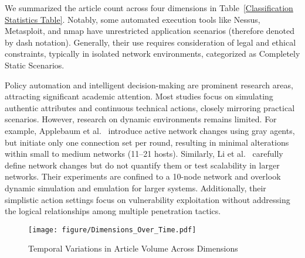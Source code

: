 
We summarized the article count across four dimensions in Table~\ref{Classification Statistics Table}. Notably, some automated execution tools like Nessus, Metasploit, and nmap have unrestricted application scenarios (therefore denoted by dash notation). Generally, their use requires consideration of legal and ethical constraints, typically in isolated network environments, categorized as Completely Static Scenarios.



Policy automation and intelligent decision-making are prominent research areas, attracting significant academic attention. Most studies focus on simulating authentic attributes and continuous technical actions, closely mirroring practical scenarios. However, research on dynamic environments remains limited. For example, Applebaum et al.~\cite{applebaum2017analysis} introduce active network changes using gray agents, but initiate only one connection set per round, resulting in minimal alterations within small to medium networks (11–21 hosts). Similarly, Li et al.~\cite{li2024dynpen} carefully define network changes but do not quantify them or test scalability in larger networks. Their experiments are confined to a 10-node network and overlook dynamic simulation and emulation for larger systems. Additionally, their simplistic action settings focus on vulnerability exploitation without addressing the logical relationships among multiple penetration tactics.

\begin{figure*}[tb]
    \centering
    \texttt{[image: figure/Dimensions\_Over\_Time.pdf]}
    \caption{Temporal Variations in Article Volume Across Dimensions}
    \label{fig: Dimensions Over Time}
\end{figure*}

